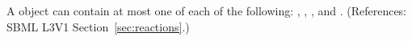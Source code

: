 A \Reaction object can contain at most one of each of the following:
, , ,
and .  (References: SBML L3V1
Section~\ref{sec:reactions}.)
